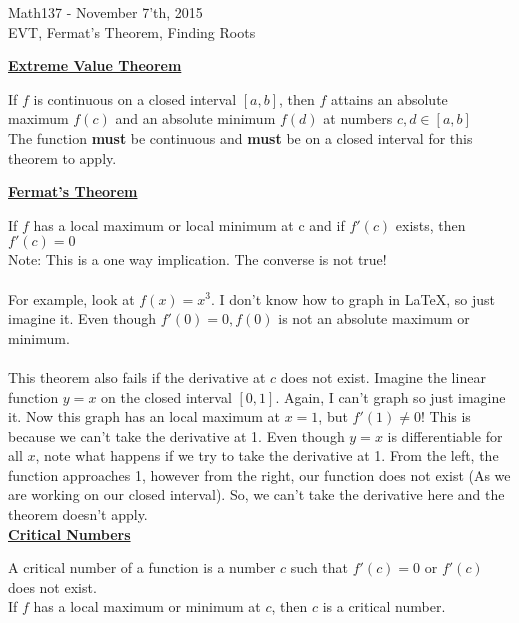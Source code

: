 \documentclass{letter}
\begin{document}
	\begin{center}
		\LARGE Math137 - November 7'th, 2015\\
		\large EVT, Fermat's Theorem, Finding Roots
	\end{center}
	\vspace{0.25 in}
	\underline{\textbf{Extreme Value Theorem}}
	
	If $f$ is continuous on a closed interval $[a, b]$, then $f$ attains an absolute maximum $f(c)$ and an absolute minimum $f(d)$ at numbers $c, d \in [a, b]$\\
	The function \textbf{must} be continuous and \textbf{must} be on a closed interval for this theorem to apply.
	
	\underline{\textbf{Fermat's Theorem}}
	
	If $f$ has a local maximum or local minimum at c and if $f'(c)$ exists, then $f'(c) = 0$\\
	Note: This is a one way implication. The converse is not true!\\\\
	For example, look at $f(x) = x^3$. I don't know how to graph in LaTeX, so just imagine it. Even though $f'(0) = 0, f(0)$ is not an absolute maximum or minimum.\\\\
	This theorem also fails if the derivative at $c$ does not exist. Imagine the linear function $y=x$ on the closed interval $[0, 1]$. Again, I can't graph so just imagine it. Now this graph has an local maximum at $x=1$, but $f'(1) \not= 0$! This is because we can't take the derivative at 1. Even though $y=x$ is differentiable for all $x$, note what happens if we try to take the derivative at 1. From the left, the function approaches 1, however from the right, our function does not exist (As we are working on our closed interval). So, we can't take the derivative here and the theorem doesn't apply.\\
	
	\underline{\textbf{Critical Numbers}}
	
	A critical number of a function is a number $c$ such that $f'(c) = 0$ or $f'(c)$ does not exist.\\
	If $f$ has a local maximum or minimum at $c$, then $c$ is a critical number.\\
	
\end{document}
